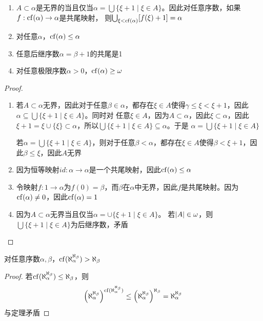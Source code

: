 \documentclass[11pt]{article}
\begin{document}
\begin{exercise}[2.3.2]
\begin{enumerate}
\item \(A\subset\alpha\)是无界的当且仅当\(\alpha=\bigcup\{\xi+1\mid\xi\in A\}\)。因此对任意序数，如果\(f:\operatorname{cf}(\alpha)\to\alpha\)是共尾映射，
则\(\bigcup_{\xi<\operatorname{cf}(\alpha)}[f(\xi)+1]=\alpha\)
\item 对任意\(\alpha\)，\(\operatorname{cf}(\alpha)\le\alpha\)
\item 任意后继序数\(\alpha=\beta+1\)的共尾是1
\item 对任意极限序数\(\alpha>0\)，\(\operatorname{cf}(\alpha)\ge\omega\)
\end{enumerate}
\end{exercise}

\begin{proof}
\begin{enumerate}
\item 若\(A\subset\alpha\)无界，因此对于任意\(\beta\in\alpha\)，都存在\(\xi\in A\)使得\(\gamma\le\xi<\xi+1\)，因此\(\alpha\subseteq\bigcup\{\xi+1\mid\xi\in A\}\)。同时对
任意\(\xi\in A\)，因为\(A\subset\alpha\)，因此\(\xi\subset\alpha\)，因此\(\xi+1=\xi\cup\{\xi\}\subset\alpha\)，所以\(\bigcup\{\xi+1\mid\xi\in A\}\subseteq\alpha\)。于是
\(\alpha=\bigcup\{\xi+1\mid\xi\in A\}\)

若\(\alpha=\bigcup\{\xi+1\mid\xi\in A\}\)，则对于任意\(\beta<\alpha\)，都存在\(\xi\in A\)使得\(\beta<\xi+1\)，因此\(\beta\le\xi\)，因此\(A\)无界

\item 因为恒等映射\(id:\alpha\to\alpha\)是一个共尾映射，因此\(\operatorname{cf}(\alpha)\le\alpha\)

\item 令映射\(f:1\to\alpha\)为\(f(0)=\beta\)，而\(\beta\)在\(\alpha\)中无界，因此\(f\)是共尾映射。因为\(\operatorname{cf}(\alpha)\neq 0\)，因此\(\operatorname{cf}(\alpha)=1\)

\item 因为\(A\subset\alpha\)无界当且仅当\(\alpha=\cup\{\xi+1\mid\xi\in A\}\)。
若\(\abs{A}\in\omega\)，则\(\bigcup\{\xi+1\mid\xi\in A\}\)为后继序数，矛盾
\end{enumerate}
\end{proof}

\begin{exercise}
\label{ex2.3.10}
对任意序数\(\alpha,\beta\)，\(\operatorname{cf}(\aleph_\alpha^{\aleph_\beta})>\aleph_\beta\)
\end{exercise}

\begin{proof}
若\(\operatorname{cf}(\aleph_\alpha^{\aleph_\beta})\le\aleph_\beta\)，则
\begin{equation*}
\left( \aleph_\alpha^{\aleph_\beta} \right)^{\operatorname{cf}(\aleph_\alpha^{\aleph_\beta})}\le
\left( \aleph_\alpha^{\aleph_\beta} \right)^{\aleph_\beta}=\aleph_\alpha^{\aleph_\beta}
\end{equation*}
与定理矛盾
\end{proof}
\end{document}
